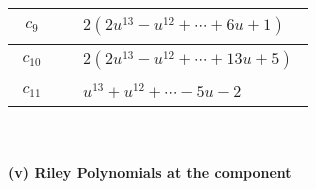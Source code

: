 \documentclass[1p]{elsarticle_modified}
\theoremstyle{definition}
\begin{document}
\begin{tabular}{m{50pt}|m{274pt}}
\hline $$\begin{aligned}c_{9}\end{aligned}$$&$\begin{aligned}
&2(2 u^{13}- u^{12}+\cdots+6 u+1)
\end{aligned}$\\
\hline $$\begin{aligned}c_{10}\end{aligned}$$&$\begin{aligned}
&2(2 u^{13}- u^{12}+\cdots+13 u+5)
\end{aligned}$\\
\hline $$\begin{aligned}c_{11}\end{aligned}$$&$\begin{aligned}
&u^{13}+u^{12}+\cdots-5 u-2
\end{aligned}$\\
\hline
\end{tabular}\\~\\
\newpage\renewcommand{\arraystretch}{1}
\flushleft \textbf{(v) Riley Polynomials at the component}\newline \\
\end{document}
